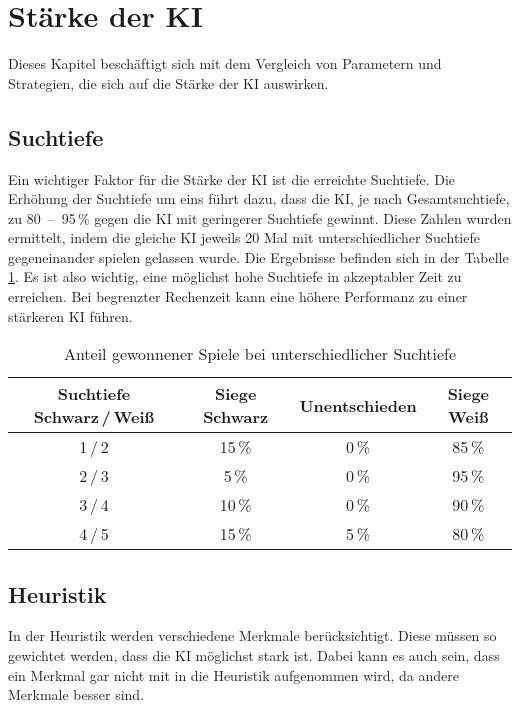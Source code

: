 
\section{Stärke der KI}
Dieses Kapitel beschäftigt sich mit dem Vergleich von Parametern und Strategien, die sich auf die Stärke der KI auswirken.

\subsection{Suchtiefe}
Ein wichtiger Faktor für die Stärke der KI ist die erreichte Suchtiefe.
Die Erhöhung der Suchtiefe um eins führt dazu, dass die KI, je nach Gesamtsuchtiefe, zu 80~–~95\,\% gegen die KI mit geringerer Suchtiefe gewinnt.
Diese Zahlen wurden ermittelt, indem die gleiche KI jeweils 20 Mal mit unterschiedlicher Suchtiefe gegeneinander spielen gelassen wurde.
Die Ergebnisse befinden sich in der Tabelle \ref{table:search-depth}.
Es ist also wichtig, eine möglichst hohe Suchtiefe in akzeptabler Zeit zu erreichen.
Bei begrenzter Rechenzeit kann eine höhere Performanz zu einer stärkeren KI führen.

\begin{table}[hb]
    \centering
    \begin{tabular}{c|ccc}
    \hline
    Suchtiefe Schwarz\,/\,Weiß & Siege Schwarz & Unentschieden & Siege Weiß \\ \hline
    1\,/\,2  & 15\,\% &  0\,\% & 85\,\% \\
    2\,/\,3  &  5\,\% &  0\,\% & 95\,\% \\
    3\,/\,4  & 10\,\% &  0\,\% & 90\,\% \\
    4\,/\,5  & 15\,\% &  5\,\% & 80\,\% \\
    \hline
    \end{tabular}
    \caption{Anteil gewonnener Spiele bei unterschiedlicher Suchtiefe}
    \label{table:search-depth}
\end{table}

\subsection{Heuristik}
In der Heuristik werden verschiedene Merkmale berücksichtigt. Diese müssen so gewichtet werden, dass die KI möglichst
stark ist. Dabei kann es auch sein, dass ein Merkmal gar nicht mit in die Heuristik aufgenommen wird, da andere Merkmale
besser sind.

